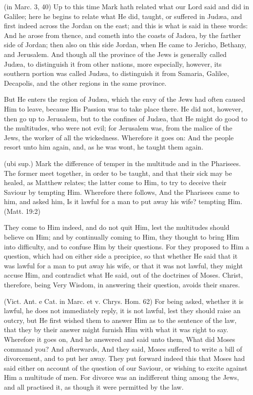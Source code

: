  (in Marc. 3, 40) Up to this time Mark hath related what our Lord said and did in Galilee; here he begins to relate what He did, taught, or suffered in Judæa, and first indeed across the Jordan on the east; and this is what is said in these words: And he arose from thence, and cometh into the coasts of Jadœa, by the farther side of Jordan; then also on this side Jordan, when He came to Jericho, Bethany, and Jerusalem. And though all the province of the Jews is generally called Judæa, to distinguish it from other nations, more especially, however, its southern portion was called Judæa, to distinguish it from Samaria, Galilee, Decapolis, and the other regions in the same province.

 But He enters the region of Judæa, which the envy of the Jews had often caused Him to leave, because His Passion was to take place there. He did not, however, then go up to Jerusalem, but to the confines of Judæa, that He might do good to the multitudes, who were not evil; for Jerusalem was, from the malice of the Jews, the worker of all the wickedness. Wherefore it goes on: And the people resort unto him again, and, as he was wont, he taught them again.

 (ubi sup.) Mark the difference of temper in the multitude and in the Pharisees. The former meet together, in order to be taught, and that their sick may be healed, as Matthew relates; the latter come to Him, to try to deceive their Saviour by tempting Him. Wherefore there follows, And the Pharisees came to him, and asked him, Is it lawful for a man to put away his wife? tempting Him. (Matt. 19:2)

 They come to Him indeed, and do not quit Him, lest the multitudes should believe on Him; and by continually coming to Him, they thought to bring Him into difficulty, and to confuse Him by their questions. For they proposed to Him a question, which had on either side a precipice, so that whether He said that it was lawful for a man to put away his wife, or that it was not lawful, they might accuse Him, and contradict what He said, out of the doctrines of Moses. Christ, therefore, being Very Wisdom, in answering their question, avoids their snares.

 (Vict. Ant. e Cat. in Marc. et v. Chrys. Hom. 62) For being asked, whether it is lawful, he does not immediately reply, it is not lawful, lest they should raise an outcry, but He first wished them to answer Him as to the sentence of the law, that they by their answer might furnish Him with what it was right to say. Wherefore it goes on, And he answered and said unto them, What did Moses command you? And afterwards, And they said, Moses suffered to write a bill of divorcement, and to put her away. They put forward indeed this that Moses had said either on account of the question of our Saviour, or wishing to excite against Him a multitude of men. For divorce was an indifferent thing among the Jews, and all practised it, as though it were permitted by the law.

